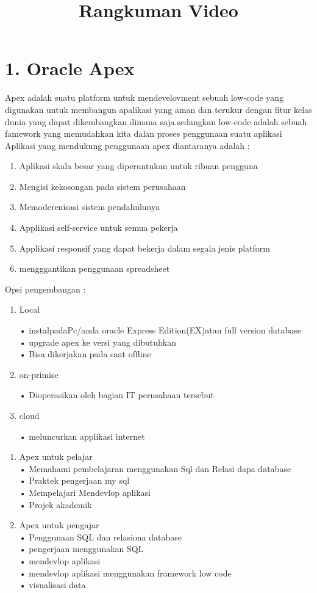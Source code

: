 \clearpage
\setcounter{page}{1}

\begin{center}
\title{\LARGE \bf Rangkuman Video}
\end{center}

\section*{\normalsize 1. Oracle Apex} 
Apex adalah suatu platform untuk mendevelovment sebuah low-code yang digunakan untuk membangun apalikasi yang aman dan terukur dengan ﬁtur kelas dunia yang dapat dikembangkan dimana saja.sedangkan low-code adalah sebuah famework yang memudahkan kita dalan proses penggunaan suatu aplikasi Aplikasi yang mendukung penggunaan apex diantaranya adalah :
\begin{enumerate}
\item Aplikasi skala besar yang diperuntukan untuk ribuan pengguna 
\item Mengisi kekosongan pada sistem perusahaan
\item Memoderenisasi sistem pendahulunya
\item Applikasi self-service untuk semua pekerja
\item Applikasi responsif yang dapat bekerja dalam segala jenis platform
\item mengggantikan penggunaan spreadsheet
\end{enumerate}
Opsi pengembangan :
\begin{enumerate}
\item Local 
\par 
• instalpadaPc/anda oracle Express Edition(EX)atau full version database \\ 
• upgrade apex ke versi yang dibutuhkan \\
• Bisa dikerjakan pada saat ofﬂine\\ 
\item on-primise 
\par 
• Dioperasikan oleh bagian IT perusahaan tersebut 
\item cloud  
\par 
• meluncurkan applikasi internet
\end{enumerate}
\begin{enumerate}
\item Apex untuk pelajar \\
• Memahami pembelajaran menggunakan Sql dan Relasi dapa database \\ 
• Praktek pengerjaan my sql \\
• Mempelajari Mendevlop aplikasi \\ 
• Projek akademik \\
\item Apex untuk pengajar \\
• Penggunaan SQL dan relasiona database \\ 
• pengerjaan menggunakan SQL \\
• mendevlop aplikasi \\
• mendevlop aplikasi menggunakan framework low code \\ 
• visualisasi data \\\
\end{enumerate} 

